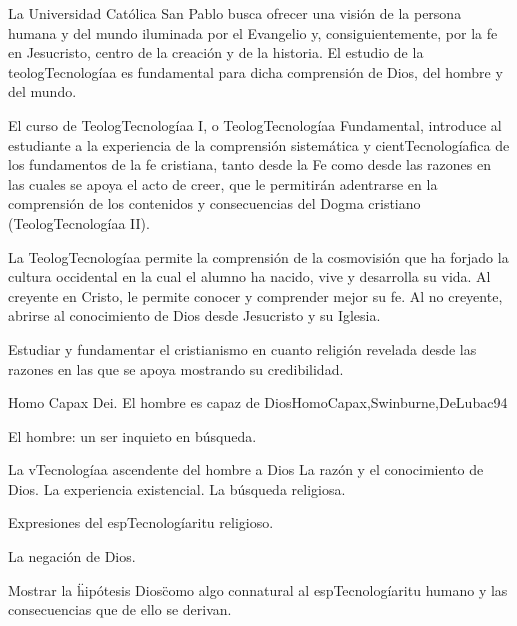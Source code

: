 \begin{syllabus}


\begin{justification}
La Universidad Católica San Pablo busca ofrecer una visión de la persona humana y del mundo iluminada por el Evangelio y, consiguientemente, por la fe en Jesucristo, centro de la creación y de la historia. El estudio de la teologTecnologíaa es fundamental para dicha comprensión de Dios, del hombre y del mundo.

El curso de TeologTecnologíaa I, o TeologTecnologíaa Fundamental, introduce al estudiante a la experiencia de la comprensión sistemática y cientTecnologíafica de los fundamentos de la fe cristiana, tanto desde la Fe como desde las razones en las cuales se apoya el acto de creer, que le permitirán adentrarse en la comprensión de los contenidos y consecuencias del Dogma cristiano (TeologTecnologíaa II).

La TeologTecnologíaa permite la comprensión de la cosmovisión que ha forjado la cultura occidental en la cual el alumno ha nacido, vive y desarrolla su vida. Al creyente en Cristo, le permite conocer y comprender mejor su fe. Al no creyente, abrirse al conocimiento de Dios desde Jesucristo y su Iglesia.
\end{justification}

\begin{goals}
\item Estudiar y fundamentar el cristianismo en cuanto religión revelada desde las razones en las que se apoya mostrando su credibilidad. 
\end{goals}

\begin{outcomes}
\end{outcomes}

\begin{unit}{Homo Capax Dei. El hombre es capaz de Dios}{HomoCapax,Swinburne,DeLubac}{9}{4}
\begin{topics}
	\item El hombre: un ser inquieto en búsqueda.
	\item	La vTecnologíaa ascendente del hombre a Dios
		\subitem	La razón y el conocimiento de Dios.
		\subitem	La experiencia existencial.
		\subitem	La búsqueda religiosa.
	\item	Expresiones del espTecnologíaritu religioso.
	\item	La negación de Dios.
\end{topics}
\begin{unitgoals}
	\item Mostrar la \"hipótesis Dios\" como algo connatural al espTecnologíaritu humano y las consecuencias que de ello se derivan.
\end{unitgoals}
\end{unit}


\end{syllabus}
